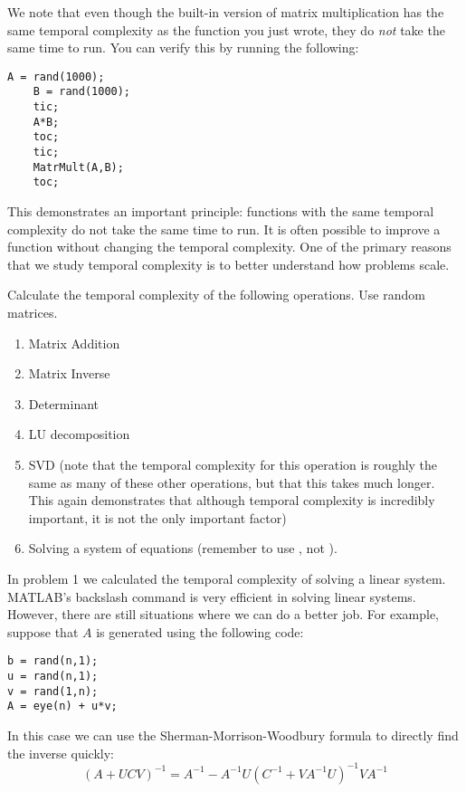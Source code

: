 We note that even though the built-in version of matrix multiplication has the same temporal complexity as the function you just wrote, they do \emph{not} take the same time to run. You can verify this by running the following:

\begin{lstlisting}[style=matlab]
    A = rand(1000);
    B = rand(1000);
    tic;
    A*B;
    toc;
    tic;
    MatrMult(A,B);
    toc;
\end{lstlisting}

This demonstrates an important principle: functions with the same temporal complexity do not take the same time to run. It is often possible to improve a function without changing the temporal complexity. One of the primary reasons that we study temporal complexity is to better understand how problems scale.


\begin{problem}
Calculate the temporal complexity of the following operations. Use random matrices.
\begin{enumerate}
\item Matrix Addition
\item Matrix Inverse
\item Determinant
\item LU decomposition
\item SVD (note that the temporal complexity for this operation is roughly the same as many of these other operations, but that this takes much longer. This again demonstrates that although temporal complexity is incredibly important, it is not the only important factor)
\item Solving a system of equations (remember to use , not ).
\end{enumerate}
\end{problem}

In problem 1 we calculated the temporal complexity of solving a linear system. MATLAB's backslash command is very efficient in solving linear systems. However, there are still situations where we can do a better job. For example, suppose that $A$ is generated using the following code:
\begin{lstlisting}[style=matlab]
b = rand(n,1);
u = rand(n,1);
v = rand(1,n);
A = eye(n) + u*v;
\end{lstlisting}

In this case we can use the Sherman-Morrison-Woodbury formula to directly find the inverse quickly:
\[
(A + UCV)^{-1} = A^{-1} - A^{-1}U(C^{-1} + VA^{-1}U)^{-1}VA^{-1}
\]

